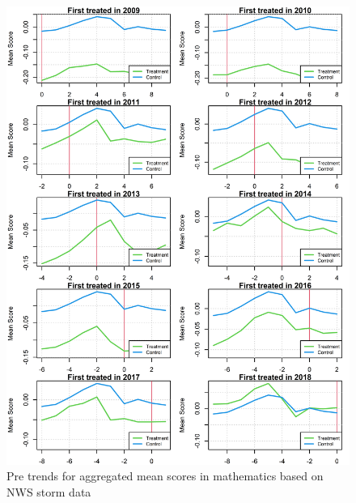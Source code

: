 \begin{figure}[!h]
	\centering
	\includegraphics[scale=1]{"../Code & Data/ParTrendsPlotMathematicsStorm.png"}
	\caption{Pre trends for aggregated mean scores in mathematics based on NWS storm data}
	\label{PreTrendsMath}
\end{figure}

